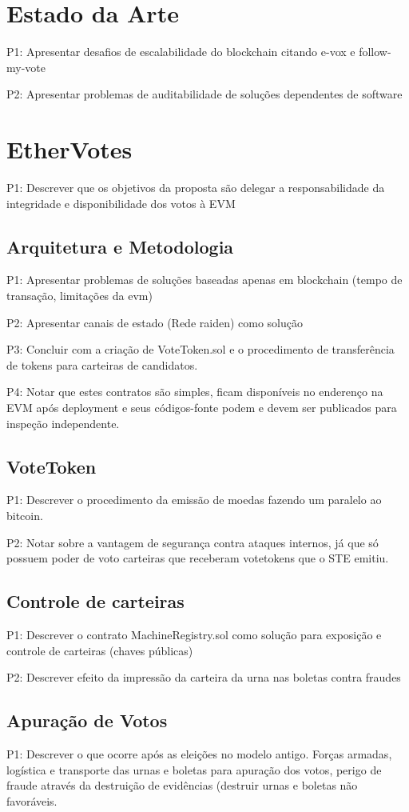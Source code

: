 \documentclass[
	article,			%
	11pt,				%
	oneside,			%
	a4paper,			%
	english,			%
	brazil,				%
	sumario=tradicional
	]{abntex2}
\begin{document}
\section{Estado da Arte}
 P1: Apresentar desafios de escalabilidade do blockchain citando e-vox e follow-my-vote
 
 P2: Apresentar problemas de auditabilidade de soluções dependentes de software
 
\section{EtherVotes}
P1: Descrever que os objetivos da proposta são delegar a responsabilidade da integridade e disponibilidade dos votos à EVM

\subsection{Arquitetura e Metodologia}
P1: Apresentar problemas de soluções baseadas apenas em blockchain (tempo de transação, limitações da evm)

P2: Apresentar canais de estado (Rede raiden) como solução

P3: Concluir com a criação de VoteToken.sol e o procedimento de transferência de tokens para carteiras de candidatos.

P4: Notar que estes contratos são simples, ficam disponíveis no enderenço na EVM após deployment e seus códigos-fonte podem e devem ser publicados para inspeção independente.

\subsection{VoteToken}
P1: Descrever o procedimento da emissão de moedas fazendo um paralelo ao bitcoin.

P2: Notar sobre a vantagem de segurança contra ataques internos, já que só possuem poder de voto carteiras que receberam votetokens que o STE emitiu. 

\subsection{Controle de carteiras}
P1: Descrever o contrato MachineRegistry.sol como solução para exposição e controle de carteiras (chaves públicas)

P2: Descrever efeito da impressão da carteira da urna nas boletas contra fraudes

\subsection{Apuração de Votos}
P1: Descrever o que ocorre após as eleições no modelo antigo. Forças armadas, logística e transporte das urnas e boletas para apuração dos votos, perigo de fraude através da destruição de evidências (destruir urnas e boletas não favoráveis.
\end{document}
